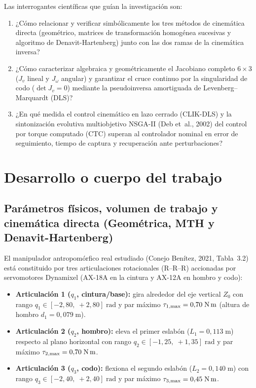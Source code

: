 \documentclass[11pt,a4paper]{article}
\begin{document}
Las interrogantes científicas que guían la investigación son:
\begin{enumerate}[label=(\roman*), topsep=3pt, itemsep=2pt]
\item ¿Cómo relacionar y verificar simbólicamente los tres métodos de cinemática directa (geométrico, matrices de transformación homogénea sucesivas y algoritmo de Denavit-Hartenberg) junto con las dos ramas de la cinemática inversa?
\item ¿Cómo caracterizar algebraica y geométricamente el Jacobiano completo $6\times 3$ ($J_{v}$ lineal y $J_{\omega}$ angular) y garantizar el cruce continuo por la singularidad de codo ($\det J_{v}=0$) mediante la pseudoinversa amortiguada de Levenberg--Marquardt (DLS)?
\item ¿En qué medida el control cinemático en lazo cerrado (CLIK-DLS) y la sintonización evolutiva multiobjetivo NSGA-II (Deb et~al., 2002) del control por torque computado (CTC) superan al controlador nominal en error de seguimiento, tiempo de captura y recuperación ante perturbaciones?
\end{enumerate}

\section{Desarrollo o cuerpo del trabajo}

\subsection{Parámetros físicos, volumen de trabajo y cinemática directa (Geométrica, MTH y Denavit-Hartenberg)}
\label{sec:fk}

El manipulador antropomórfico real estudiado (Conejo Benítez, 2021, Tabla~3.2) está constituido por tres articulaciones rotacionales ($\text{R--R--R}$) accionadas por servomotores Dynamixel (AX-18A en la cintura y AX-12A en hombro y codo):
\begin{itemize}[leftmargin=*, topsep=2pt, itemsep=1pt]
\item \textbf{Articulación 1 ($q_{1}$, cintura/base):} gira alrededor del eje vertical $Z_{0}$ con rango $q_{1}\in[-2{,}80,\;+2{,}80]\;\text{rad}$ y par máximo $\tau_{1,\max}=0{,}70\;\text{N\,m}$ (altura de hombro $d_{1}=0{,}079\;\text{m}$).
\item \textbf{Articulación 2 ($q_{2}$, hombro):} eleva el primer eslabón ($L_{1}=0{,}113\;\text{m}$) respecto al plano horizontal con rango $q_{2}\in[-1{,}25,\;+1{,}35]\;\text{rad}$ y par máximo $\tau_{2,\max}=0{,}70\;\text{N\,m}$.
\item \textbf{Articulación 3 ($q_{3}$, codo):} flexiona el segundo eslabón ($L_{2}=0{,}140\;\text{m}$) con rango $q_{3}\in[-2{,}40,\;+2{,}40]\;\text{rad}$ y par máximo $\tau_{3,\max}=0{,}45\;\text{N\,m}$.
\end{itemize}
\end{document}
